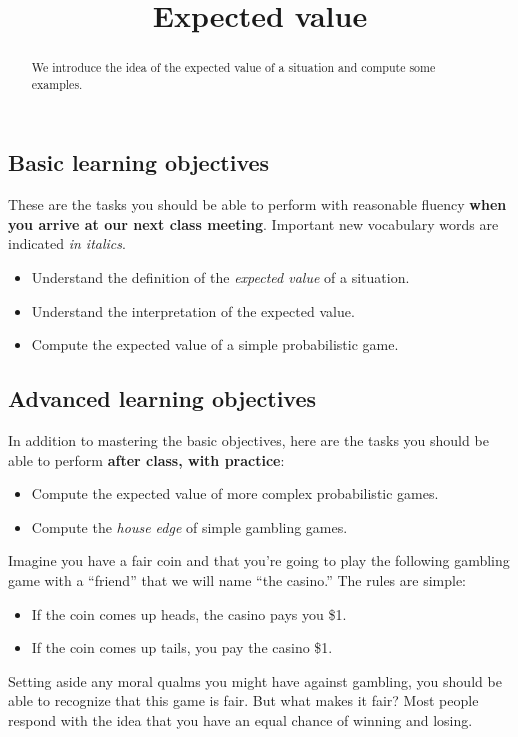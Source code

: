\documentclass{ximera}
\title{Expected value}
\begin{document}
\begin{abstract}
We introduce the idea of the expected value of a situation and compute some examples.
\end{abstract}
\maketitle

\subsection*{Basic learning objectives}

These are the tasks you should be able to perform with reasonable fluency \textbf{when you arrive at our next class meeting}. Important new vocabulary words are indicated \emph{in italics}. 

\begin{itemize}
	\item Understand the definition of the \emph{expected value} of a situation.
    \item Understand the interpretation of the expected value.
    \item Compute the expected value of a simple probabilistic game.
\end{itemize}

\subsection*{Advanced learning objectives}

In addition to mastering the basic objectives, here are the tasks you should be able to perform \textbf{after class, with practice}: 

\begin{itemize}
    \item Compute the expected value of more complex probabilistic games.
    \item Compute the \emph{house edge} of simple gambling games.
\end{itemize}

Imagine you have a fair coin and that you're going to play the following gambling game with a ``friend'' that we will name ``the casino.'' The rules are simple:
\begin{itemize}
  \item If the coin comes up heads, the casino pays you \$1.
  \item If the coin comes up tails, you pay the casino \$1.
\end{itemize}
Setting aside any moral qualms you might have against gambling, you should be able to recognize that this game is fair. But what makes it fair? Most people respond with the idea that you have an equal chance of winning and losing.
\end{document}
